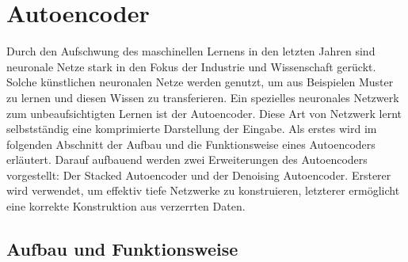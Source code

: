 \section{Autoencoder}

Durch den Aufschwung des maschinellen Lernens in den letzten Jahren sind neuronale Netze stark in den Fokus der Industrie und Wissenschaft gerückt. Solche künstlichen neuronalen Netze werden genutzt, um aus Beispielen Muster zu lernen und diesen Wissen zu transferieren. 
Ein spezielles neuronales Netzwerk zum unbeaufsichtigten Lernen ist der Autoencoder. Diese Art von Netzwerk lernt selbstständig eine komprimierte Darstellung der Eingabe. 
Als erstes wird im folgenden Abschnitt der Aufbau und die Funktionsweise eines Autoencoders erläutert. Darauf aufbauend werden zwei Erweiterungen des Autoencoders vorgestellt: Der Stacked Autoencoder und der Denoising Autoencoder. Ersterer wird verwendet, um effektiv tiefe Netzwerke zu konstruieren, letzterer ermöglicht eine korrekte Konstruktion aus verzerrten Daten.

\subsection{Aufbau und Funktionsweise}

